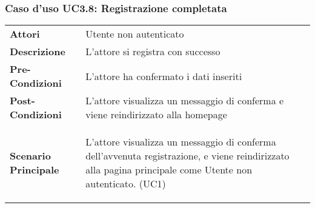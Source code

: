 \subsubsection{Caso d'uso UC3.8:  Registrazione completata}
\label{UC3_8}

\begin{longtable}{ l | p{11cm}}
	\hline
	\rowcolor{Gray}
	\multicolumn{2}{c}{UC3.8 - Registrazione completata} \\
	\hline
	\textbf{Attori} & Utente non autenticato \\
	\textbf{Descrizione} & L'attore si registra con successo  \\
	\textbf{Pre-Condizioni} & L'attore ha confermato i dati inseriti \\
	\textbf{Post-Condizioni} & L'attore visualizza un messaggio di conferma e viene reindirizzato alla homepage \\
	\textbf{Scenario Principale} & \begin{enumerate*}[label=(\arabic*.),itemjoin={\newline}]
		\item L'attore visualizza un messaggio di conferma dell'avvenuta registrazione, e viene reindirizzato alla pagina principale come Utente non autenticato. (UC1)
	\end{enumerate*}\\
\end{longtable}